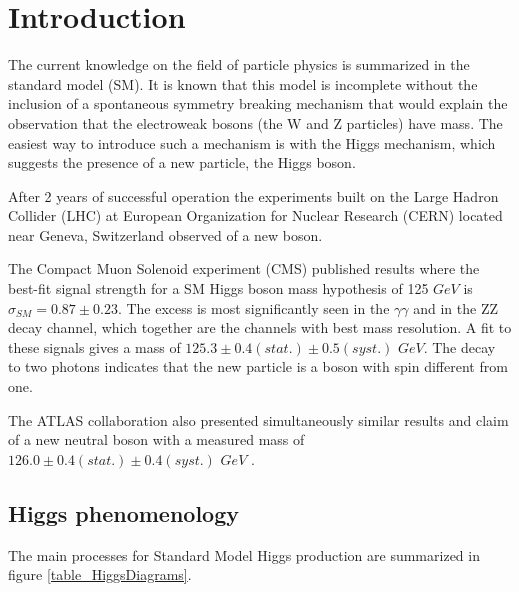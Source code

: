 \documentclass[%
reprint,
amsmath,
amssymb,
aps,
pra,
showkeys
]{revtex4-1}
\begin{document}
\setlength{\unitlength}{1mm}

\section{Introduction}

The current knowledge on the field of particle physics is summarized in the standard model (SM). It is known that
this model is incomplete without the inclusion of a spontaneous symmetry breaking mechanism that would explain
the observation that the electroweak bosons (the W and Z particles) have mass. The easiest way to introduce such
a mechanism is with the Higgs mechanism, which suggests the presence of a new particle, the Higgs boson.

After 2 years of successful operation the experiments built on the Large Hadron Collider (LHC) at
European Organization for Nuclear Research (CERN) located near Geneva, Switzerland observed of
a new boson.

The Compact Muon Solenoid experiment (CMS) published results where the best-fit signal strength for a SM Higgs boson 
mass hypothesis of 125 $GeV$ is $\sigma_{SM}=0.87\pm0.23$. The excess is most significantly seen in the $\gamma\gamma$ 
and in the ZZ decay channel, which together are the channels with best mass resolution. A fit to these signals gives 
a mass of $125.3 \pm 0.4 (stat.) \pm 0.5 (syst.)$ $GeV$. The decay to two photons indicates that the new particle is 
a boson with spin different from one\cite{article:CMS-HIG-12-028}.

The ATLAS collaboration also presented simultaneously similar results and claim of a new neutral boson
with a measured mass of $126.0 \pm 0.4 (stat.) \pm 0.4 (syst.)$ $GeV$ \cite{article:CERN-PH-EP-2012-218}.

\subsection{Higgs phenomenology}

The main processes for Standard Model Higgs production are summarized in figure \ref{table_HiggsDiagrams}.
\end{document}

